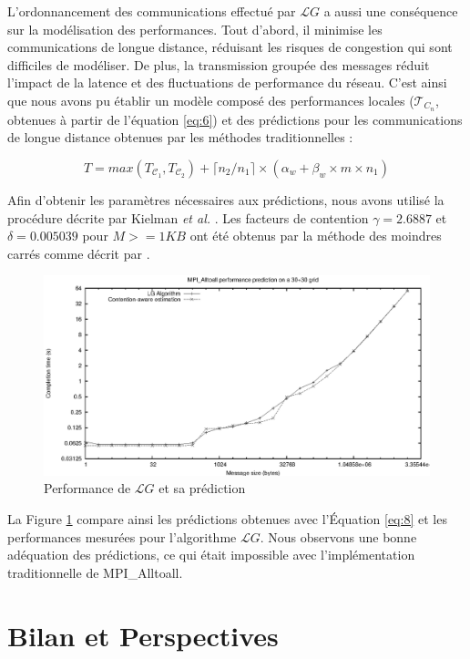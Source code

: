L'ordonnancement des communications effectué par ${\mathcal LG}$ a aussi une conséquence sur la modélisation des performances. Tout d'abord, il minimise les communications de longue distance, réduisant les risques de congestion qui sont difficiles de modéliser. De plus, la transmission groupée des messages réduit l'impact de la latence et des fluctuations de performance du réseau. C'est ainsi que nous avons pu établir un modèle composé des performances locales (${\mathcal T_{C_{n}}}$, obtenues à partir de l'équation \ref{eq:6}) et des prédictions pour les communications de longue distance obtenues par les méthodes traditionnelles :

\begin{equation}
T=max(T_{\mathcal C_1},T_{\mathcal C_2})+\lceil n_2/n_1\rceil \times (\alpha_w+\beta_w \times m \times n_1)
\label{eq:8}\end{equation}

Afin d'obtenir les paramètres nécessaires aux prédictions, nous avons utilisé la procédure décrite par Kielman \textit{et al.} \cite{Kielmann00}. Les facteurs de contention $\gamma=2.6887$ et $\delta=0.005039$ pour $M>=1KB$ ont été obtenus par la méthode des moindres carrés comme décrit par \cite{Steffenel06b}.

\begin{figure}
	\centering
		\includegraphics[width=0.7\columnwidth]{images/simul}
	\caption{\label{Figure: simul}Performance de ${\mathcal LG}$ et sa prédiction}
\end{figure}

La Figure \ref{Figure: simul} compare ainsi les prédictions obtenues avec l'Équation \ref{eq:8} et les performances mesurées pour l'algorithme ${\mathcal LG}$. Nous observons une bonne adéquation des prédictions, ce qui était impossible avec l'implémentation traditionnelle de MPI\_Alltoall. 

\section{Bilan et Perspectives}

